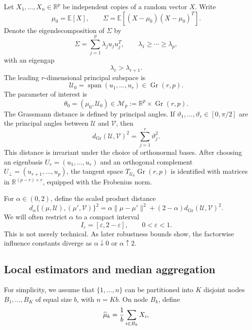 \documentclass[11pt]{article}
\newcommand{\R}{\mathbb R}
\newcommand{\E}{\mathbb E}
\newcommand{\M}{\mathcal M}
\newcommand{\U}{\mathcal U}
\newcommand{\V}{\mathcal V}
\newcommand{\Gr}{\operatorname{Gr}}
\newcommand{\Span}{\operatorname{span}}
\newcommand{\eps}{\varepsilon}
\begin{document}
Let \(X_1,\ldots,X_n\in\R^p\) be independent copies of a random vector \(X\).  Write
\begin{equation*}
    \mu_0=\E [X],
    \qquad
    \Sigma=\E[(X-\mu_0)(X-\mu_0)^T].
\end{equation*}
Denote  the eigendecomposition of \(\Sigma\) by
\[
    \Sigma=\sum_{j=1}^p \lambda_j u_j u_j^T,
    \qquad
    \lambda_1\ge\cdots\ge\lambda_p,
\]
with an eigengap
\begin{equation}\label{eq:eigengap}
    \lambda_r>\lambda_{r+1}.
\end{equation}
The leading \(r\)-dimensional principal subspace is
\[
    \U_0=\Span(u_1,\ldots,u_r)\in\Gr(r,p).
\]
The parameter of interest is
\[
    \theta_0=(\mu_0,\U_0)\in\M_p:=\R^p\times\Gr(r,p).
\]
The Grassmann distance is defined by principal angles.  If \(\vartheta_1,\ldots,\vartheta_r\in[0,\pi/2]\) are the principal angles between \(\U\) and \(\V\), then
\begin{equation}\label{eq:grassmann-distance}
    d_{\Gr}(\U,\V)^2=\sum_{j=1}^r \vartheta_j^2.
\end{equation}
This distance is invariant under the choice of orthonormal bases.  After choosing
an eigenbasis \(U_r=(u_1,\ldots,u_r)\) and an orthogonal complement \(U_\perp=(u_{r+1},\ldots,u_p)\), the tangent space \(T_{\U_0}\Gr(r,p)\) is identified with matrices in \(\R^{(p-r)\times r}\), equipped with the Frobenius norm.

For \(\alpha\in(0,2)\), define the scaled product distance
\begin{equation}\label{eq:scaled-distance}
    d_\alpha\{(\mu,\U),(\mu',\V)\}^2
    =\alpha\|\mu-\mu'\|^2+(2-\alpha)d_{\Gr}(\U,\V)^2.
\end{equation}
We will often restrict \(\alpha\) to a compact interval
\begin{equation}\label{eq:I-eps}
    I_\eps=[\eps,2-\eps],\qquad 0<\eps<1.
\end{equation}
This is not merely technical.  As later robustness bounds show, the factorwise influence constants diverge as \(\alpha\downarrow0\) or \(\alpha\uparrow2\).

\subsection{Local estimators and median aggregation}

For simplicity, we assume that \(\{1,\ldots,n\}\) can be partitioned into \(K\) disjoint nodes \(B_1,\ldots,B_K\) of equal size \(b\), with \(n=Kb\).  On node \(B_k\), define
\begin{equation}\label{eq:shard-mean}
    \widehat\mu_k={1\over b}\sum_{i\in B_k}X_i,
\end{equation}
\end{document}

